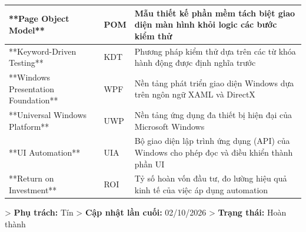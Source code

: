 \begin{table}[H]
\begin{tabular}{|l|l|l|}
**Page Object Model** & POM & Mẫu thiết kế phần mềm tách biệt giao diện màn hình khỏi logic các bước kiểm thử \\ \hline
**Keyword-Driven Testing** & KDT & Phương pháp kiểm thử dựa trên các từ khóa hành động được định nghĩa trước \\ \hline
**Windows Presentation Foundation** & WPF & Nền tảng phát triển giao diện Windows dựa trên ngôn ngữ XAML và DirectX \\ \hline
**Universal Windows Platform** & UWP & Nền tảng ứng dụng đa thiết bị hiện đại của Microsoft Windows \\ \hline
**UI Automation** & UIA & Bộ giao diện lập trình ứng dụng (API) của Windows cho phép đọc và điều khiển thành phần UI \\ \hline
**Return on Investment** & ROI & Tỷ số hoàn vốn đầu tư, đo lường hiệu quả kinh tế của việc áp dụng automation \\ \hline
\end{tabular}
\end{table}





> \textbf{Phụ trách:} Tín  
> \textbf{Cập nhật lần cuối:} 02/10/2026  
> \textbf{Trạng thái:} Hoàn thành
